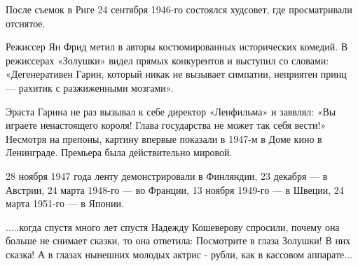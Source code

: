 После съемок в Риге 24 сентября 1946-го состоялся худсовет, где просматривали
отснятое.

Режиссер Ян Фрид метил в авторы костюмированных исторических комедий. В
режиссерах «Золушки» видел прямых конкурентов и выступил со словами:
«Дегенеративен Гарин, который никак не вызывает симпатии, неприятен принц —
рахитик с разжиженными мозгами».

Эраста Гарина не раз вызывал к себе директор «Ленфильма» и заявлял: «Вы играете
ненастоящего короля! Глава государства не может так себя вести!» Несмотря на
препоны, картину впервые показали в 1947-м в Доме кино в Ленинграде.  Премьера
была действительно мировой.

28 ноября 1947 года ленту демонстрировали в Финляндии, 23 декабря --- в Австрии,
24 марта 1948-го --- во Франции, 13 ноября 1949-го --- в Швеции, 24 марта 1951-го —
в Японии.

.....когда спустя много лет спустя Надежду Кошеверову спросили, почему она больше не снимает сказки, то она ответила: Посмотрите в глаза Золушки! В них сказка! А в глазах нынешних молодых актрис - рубли, как в кассовом аппарате...

